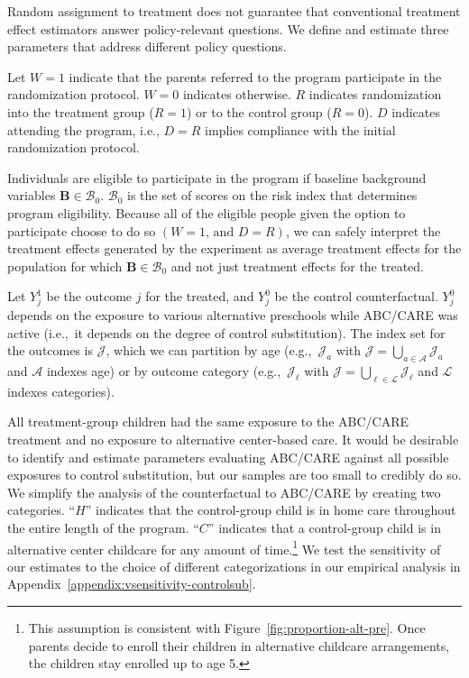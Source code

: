 Random assignment to treatment does not guarantee that conventional treatment effect estimators answer policy-relevant questions. We define and estimate three parameters that address different policy questions.

Let $W=1$ indicate that the parents referred to the program participate in the randomization protocol. $W=0$ indicates otherwise. $R$ indicates randomization into the treatment group ($R = 1$) or to the control group ($R = 0$). $D$ indicates attending the program, i.e., $D = R$ implies compliance with the initial randomization protocol.

Individuals are eligible to participate in the program if baseline background variables $\bm{B}\in\mathcal{B}_0$. $\mathcal{B}_0$ is the set of scores on the risk index that determines program eligibility. Because all of the eligible people given the option to participate choose to do so $(W=1\text{, and } D=R)$, we can safely interpret the treatment effects generated by the experiment as average treatment effects for the population for which $\bm{B}\in\mathcal{B}_0$ and not just treatment effects for the treated.

Let $Y^1_{j}$ be the outcome $j$ for the treated, and $Y^0_{j}$ be the control counterfactual. $Y^0_{j}$ depends on the exposure to various alternative preschools while ABC/CARE was active (i.e.,\ it depends on the degree of control substitution). The index set for the outcomes is $\mathcal{J}$, which we can partition by age (e.g.,\ $\mathcal{J}_a$ with $\mathcal{J} = \bigcup \limits _{a \in \mathcal{A}} \mathcal{J}_a$ and $\mathcal{A}$ indexes age) or by outcome category (e.g.,\ $\mathcal{J}_\ell$ with $\mathcal{J} = \bigcup \limits _{\ell \in \mathcal{L}} \mathcal{J}_\ell$ and $\mathcal{L}$ indexes categories). 

 All treatment-group children had the same exposure to the ABC/CARE treatment and no exposure to alternative center-based care. It would be desirable to identify and estimate parameters evaluating ABC/CARE against all possible exposures to control substitution, but our samples are too small to credibly do so. We simplify the analysis of the counterfactual to ABC/CARE by creating two categories. ``$H$'' indicates that the control-group child is in home care throughout the entire length of the program. ``$C$'' indicates that a control-group child is in alternative center childcare for any amount of time.\footnote{This assumption is consistent with Figure~\ref{fig:proportion-alt-pre}. Once parents decide to enroll their children in alternative childcare arrangements, the children stay enrolled up to age 5.} We test the sensitivity of our estimates to the choice of different categorizations in our empirical analysis in Appendix~\ref{appendix:vsensitivity-controlsub}.

